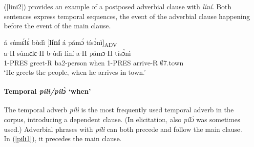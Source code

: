 \noindent (\ref{lini2}) provides an example of a postposed adverbial clause with {\itshape líní}. Both sentences express temporal sequences, the event of the adverbial clause happening before the event of the main clause.

\begin{exe}
\ex\label{lini2}
  \glll     á súmɛ́lɛ́ bùdì [{\bfseries líní} á pámɔ́ tísɔ̀nì]\textsubscript{ADV} \\
            a-H súmɛlɛ-H b-ùdì líní a-H pámɔ-H tísɔ̀nì  \\
            1-PRES greet-R ba2-person when 1-PRES arrive-R $\emptyset$7.town \\
    \trans `He greets the people, when he arrives in town.'
\end{exe}





\paragraph{Temporal {\itshape pílì/pílɔ̀} `when'}



The temporal adverb {\itshape pílì} is the most frequently used temporal adverb  in the corpus, introducing a dependent clause. (In elicitation, also {\itshape pílɔ̀} was sometimes used.) Adverbial phrases with {\itshape pílì} can both precede and follow the main clause. In (\ref{pili1}), it precedes the main clause.

